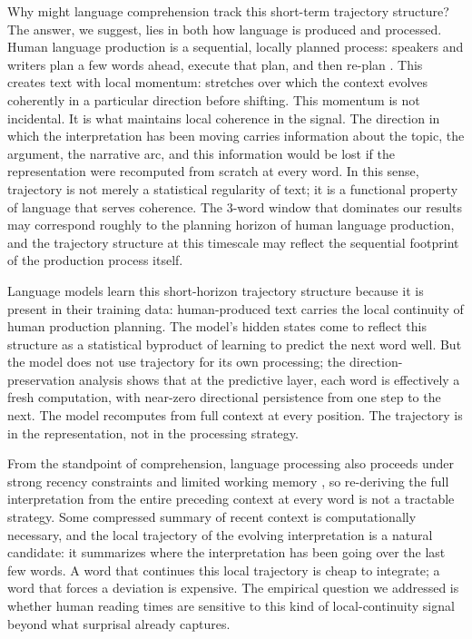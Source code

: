 \documentclass[12pt]{article}
\begin{document}
Why might language comprehension track this short-term trajectory structure? The answer, we suggest, lies in both how language is produced and processed. Human language production is a sequential, locally planned process: speakers and writers plan a few words ahead, execute that plan, and then re-plan \citep{levelt1989,ferreira2002}. This creates text with local momentum: stretches over which the context evolves coherently in a particular direction before shifting. This momentum is not incidental. It is what maintains local coherence in the signal. The direction in which the interpretation has been moving carries information about the topic, the argument, the narrative arc, and this information would be lost if the representation were recomputed from scratch at every word. In this sense, trajectory is not merely a statistical regularity of text; it is a functional property of language that serves coherence. The 3-word window that dominates our results may correspond roughly to the planning horizon of human language production, and the trajectory structure at this timescale may reflect the sequential footprint of the production process itself.

Language models learn this short-horizon trajectory structure because it is present in their training data: human-produced text carries the local continuity of human production planning. The model's hidden states come to reflect this structure as a statistical byproduct of learning to predict the next word well. But the model does not use trajectory for its own processing; the direction-preservation analysis shows that at the predictive layer, each word is effectively a fresh computation, with near-zero directional persistence from one step to the next. The model recomputes from full context at every position. The trajectory is in the representation, not in the processing strategy.

From the standpoint of comprehension, language processing also proceeds under strong recency constraints and limited working memory \citep{gibson1998,lewis2005}, so re-deriving the full interpretation from the entire preceding context at every word is not a tractable strategy. Some compressed summary of recent context is computationally necessary, and the local trajectory of the evolving interpretation is a natural candidate: it summarizes where the interpretation has been going over the last few words. A word that continues this local trajectory is cheap to integrate; a word that forces a deviation is expensive. The empirical question we addressed is whether human reading times are sensitive to this kind of local-continuity signal beyond what surprisal already captures.
\end{document}
